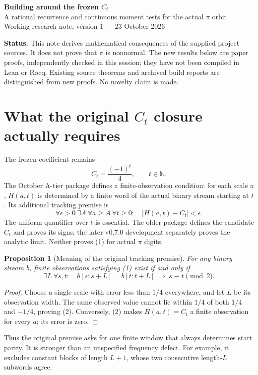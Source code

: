 \documentclass[10pt,a4paper]{article}
\newtheorem{proposition}[theorem]{Proposition}
\newcommand{\N}{\mathbb N}\newcommand{\T}{\mathbb R/\mathbb Z}
\begin{document}
\begin{center}
{\Large\bfseries\textcolor{ink}{Building around the frozen $C_t$}}\\[5pt]
{\large A rational recurrence and continuous moment tests for the actual $\pi$ orbit}\\[5pt]
{Working research note, version 1 --- 23 October 2026}
\end{center}
\textbf{Status.} This note derives mathematical consequences of the supplied project sources. It does not prove that $\pi$ is nonnormal. The new results below are paper proofs, independently checked in this session; they have not been compiled in Lean or Rocq. Existing source theorems and archived build reports are distinguished from new proofs. No novelty claim is made.

\section{What the original \texorpdfstring{$C_t$}{C_t} closure actually requires}
The frozen coefficient remains
\[
 C_t=\frac{(-1)^t}{4},\qquad t\in\N.
\]
The October A-tier package defines a finite-observation condition: for each scale $a$, $H(a,t)$ is determined by a finite word of the actual binary stream starting at $t$. Its additional tracking premise is
\[
 \forall\epsilon>0\ \exists A\ \forall a\ge A\ \forall t\ge0:
 \quad |H(a,t)-C_t|<\epsilon.                 \tag{1}
\]
The uniform quantifier over $t$ is essential. The older package defines the candidate $C_t$ and proves its signs; the later v0.7.0 development separately proves the analytic limit. Neither proves (1) for actual $\pi$ digits.

\begin{proposition}[Meaning of the original tracking premise]
For any binary stream $b$, finite observations satisfying (1) exist if and only if
\[
 \exists L\ \forall s,t:\quad
 b[s:s+L]=b[t:t+L]\ \Longrightarrow\ s\equiv t\pmod2.       \tag{2}
\]
\end{proposition}
\begin{proof}
Choose a single scale with error less than $1/4$ everywhere, and let $L$ be its observation width. The same observed value cannot lie within $1/4$ of both $1/4$ and $-1/4$, proving (2). Conversely, (2) makes $H(a,t)=C_t$ a finite observation for every $a$; its error is zero.
\end{proof}
Thus the original premise asks for one finite window that always determines start parity. It is stronger than an unspecified frequency defect. For example, it excludes constant blocks of length $L+1$, whose two consecutive length-$L$ subwords agree.
\end{document}
